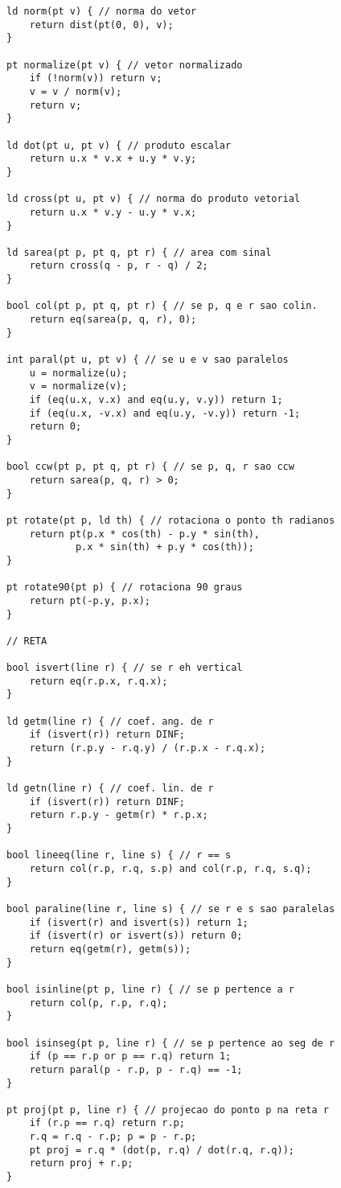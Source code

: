 \documentclass[12pt, a4paper, twoside]{article}
\begin{document}
\begin{lstlisting}
ld norm(pt v) { // norma do vetor
	return dist(pt(0, 0), v);
}

pt normalize(pt v) { // vetor normalizado
	if (!norm(v)) return v;
	v = v / norm(v);
	return v;
}

ld dot(pt u, pt v) { // produto escalar
	return u.x * v.x + u.y * v.y;
}

ld cross(pt u, pt v) { // norma do produto vetorial
	return u.x * v.y - u.y * v.x;
}

ld sarea(pt p, pt q, pt r) { // area com sinal
	return cross(q - p, r - q) / 2;
}

bool col(pt p, pt q, pt r) { // se p, q e r sao colin.
	return eq(sarea(p, q, r), 0);
}

int paral(pt u, pt v) { // se u e v sao paralelos
	u = normalize(u);
	v = normalize(v);
	if (eq(u.x, v.x) and eq(u.y, v.y)) return 1;
	if (eq(u.x, -v.x) and eq(u.y, -v.y)) return -1;
	return 0;
}

bool ccw(pt p, pt q, pt r) { // se p, q, r sao ccw
	return sarea(p, q, r) > 0;
}

pt rotate(pt p, ld th) { // rotaciona o ponto th radianos
	return pt(p.x * cos(th) - p.y * sin(th),
			p.x * sin(th) + p.y * cos(th));
}

pt rotate90(pt p) { // rotaciona 90 graus
	return pt(-p.y, p.x);
}

// RETA

bool isvert(line r) { // se r eh vertical
	return eq(r.p.x, r.q.x);
}

ld getm(line r) { // coef. ang. de r
	if (isvert(r)) return DINF;
	return (r.p.y - r.q.y) / (r.p.x - r.q.x);
}

ld getn(line r) { // coef. lin. de r
	if (isvert(r)) return DINF;
	return r.p.y - getm(r) * r.p.x;
}

bool lineeq(line r, line s) { // r == s
	return col(r.p, r.q, s.p) and col(r.p, r.q, s.q);
}

bool paraline(line r, line s) { // se r e s sao paralelas
	if (isvert(r) and isvert(s)) return 1;
	if (isvert(r) or isvert(s)) return 0;
	return eq(getm(r), getm(s));
}

bool isinline(pt p, line r) { // se p pertence a r
	return col(p, r.p, r.q);
}

bool isinseg(pt p, line r) { // se p pertence ao seg de r
	if (p == r.p or p == r.q) return 1;
	return paral(p - r.p, p - r.q) == -1;
}

pt proj(pt p, line r) { // projecao do ponto p na reta r
	if (r.p == r.q) return r.p;
	r.q = r.q - r.p; p = p - r.p;
	pt proj = r.q * (dot(p, r.q) / dot(r.q, r.q));
	return proj + r.p;
}


\end{lstlisting}
\end{document}
